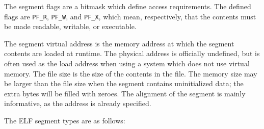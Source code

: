 The segment flags are a bitmask which define access requirements.  The defined
flags are \texttt{PF\_R}, \texttt{PF\_W}, and \texttt{PF\_X}, which mean, respectively,
that the contents must be made readable, writable, or executable.

The segment virtual address is the memory address at which the segment contents
are loaded at runtime.  The physical address is officially undefined, but is
often used as the load address when using a system which does not use virtual
memory.  The file size is the size of the contents in the file.  The memory
size may be larger than the file size when the segment contains uninitialized
data; the extra bytes will be filled with zeroes.  The alignment of the segment
is mainly informative, as the address is already specified.

The ELF segment types are as follows:

